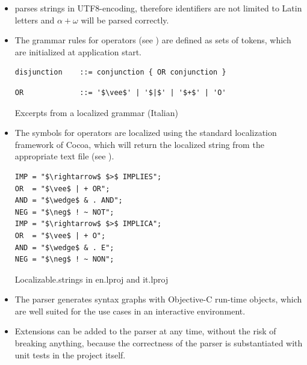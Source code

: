 \begin{itemize}

\item \Nyaya parses strings in UTF8-encoding, 
therefore identifiers are not limited to Latin letters and
$\alpha + \omega$ will be parsed correctly. 

\item The grammar rules for operators (see ) 
are defined as sets of tokens, 
which are initialized at application start. 

\begin{table}[htdp]
\begin{center}
\begin{lstlisting}[mathescape,firstnumber=7, xleftmargin=1cm]
disjunction    ::= conjunction { OR conjunction }   
\end{lstlisting}
\begin{lstlisting}[mathescape,firstnumber=15, xleftmargin=1cm]
OR             ::= '$\vee$' | '$|$' | '$+$' | 'O'
\end{lstlisting}
\caption{Excerpts from a localized grammar (Italian)}
\label{tab:LocalizedEBNF}
\end{center}
\end{table}

\item The symbols for operators
are localized using the standard localization framework of Cocoa,
which will return the localized string from the appropriate
text file (see ).

\begin{table}[htdp]
\begin{center}
\begin{lstlisting}[mathescape,numbers=none,multicols=2, xleftmargin=1cm]
IMP = "$\rightarrow$ $>$ IMPLIES";
OR  = "$\vee$ | + OR";
AND = "$\wedge$ & . AND";
NEG = "$\neg$ ! ~ NOT";
IMP = "$\rightarrow$ $>$ IMPLICA";
OR  = "$\vee$ | + O";
AND = "$\wedge$ & . E";
NEG = "$\neg$ ! ~ NON";
\end{lstlisting}
\caption{Localizable.strings in en.lproj and it.lproj}
\label{tab:LocalizableStrings}
\end{center}
\end{table}


\item The parser generates syntax graphs with Objective-C run-time objects,
which are well suited for the use cases in an interactive environment.

\item 
Extensions can be added to the parser at any time, without the risk of breaking anything,
because the correctness of the parser is substantiated with unit tests in the project itself. 


\end{itemize}

